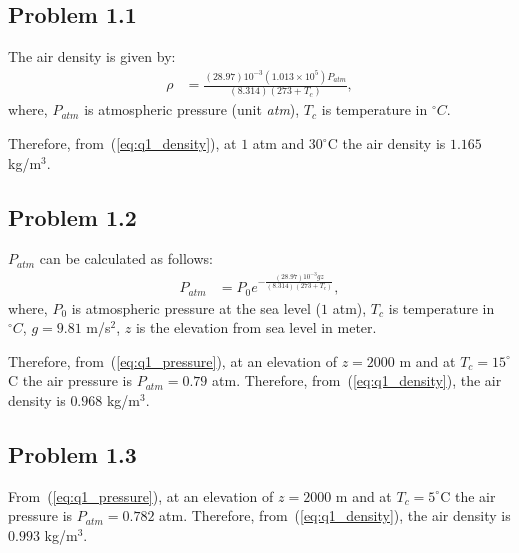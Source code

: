 \subsection*{Problem 1.1}
The air density is given by:
\begin{align}\label{eq:q1_density}
	\rho &= \frac{(28.97)10^{-3}(1.013\times 10^5)P_{atm}}{(8.314)(273+T_c)},
\end{align}
where, $P_{atm}$ is atmospheric pressure (unit \textit{atm}), $T_c$ is temperature in $^{\circ}C$.

Therefore, from~(\ref{eq:q1_density}), at $1$ atm and $30^{\circ}$C the air density is $1.165$ kg/m$^3$.
\subsection*{Problem 1.2}
$P_{atm}$ can be calculated as follows:
\begin{align}\label{eq:q1_pressure}
P_{atm} &= P_0e^{-\frac{(28.97)10^{-3}gz}{(8.314)(273+T_c)}},
\end{align}
where, $P_{0}$ is atmospheric pressure at the sea level ($1$ atm), $T_c$ is temperature in $^{\circ}C$, $g=9.81$ m/s$^2$, $z$ is the elevation from sea level in meter.

Therefore, from~(\ref{eq:q1_pressure}), at an elevation of $z=2000$ m and at $T_c=15^{\circ}$C the air pressure is $P_{atm}=0.79$ atm. Therefore, from~(\ref{eq:q1_density}), the air density is $0.968$ kg/m$^3$.
\subsection*{Problem 1.3}
From~(\ref{eq:q1_pressure}), at an elevation of $z=2000$ m and at $T_c=5^{\circ}$C the air pressure is $P_{atm}=0.782$ atm. Therefore, from~(\ref{eq:q1_density}), the air density is $0.993$ kg/m$^3$.

